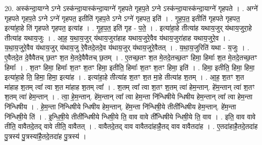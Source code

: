 \documentclass[17pt]{extarticle}
\begin{document}
20. अस्क॑न्दा॒याग्ने ऽग्ने ऽस्क॑न्दा॒यास्क॑न्दा॒याग्ने॑ गृहपते गृहप॒ते ऽग्ने ऽस्क॑न्दा॒यास्क॑न्दा॒याग्ने॑ गृहपते । . अग्ने॑ गृहपते गृहप॒ते ऽग्ने ऽग्ने॑ गृहपत॒ इतीति॑ गृहप॒ते ऽग्ने ऽग्ने॑ गृहपत॒ इति॑ । . गृ॒ह॒प॒त॒ इतीति॑ गृहपते गृहपत॒ इत्या॑हा॒हे ति॑ गृहपते गृहपत॒ इत्या॑ह । . गृ॒ह॒प॒त॒ इति॑ गृह - प॒ते॒ । . इत्या॑हा॒हे तीत्या॑ह यथाय॒जुर् य॑थाय॒जुरा॒हे तीत्या॑ह यथाय॒जुः । . आ॒ह॒ य॒था॒य॒जुर् य॑थाय॒जुरा॑हाह यथाय॒जुरे॒वैव य॑थाय॒जुरा॑हाह यथाय॒जुरे॒व । . य॒था॒य॒जुरे॒वैव य॑थाय॒जुर् य॑थाय॒जु रे॒वैतदे॒तदे॒व य॑थाय॒जुर् य॑थाय॒जुरे॒वैतत् । . य॒था॒य॒जुरिति॑ यथा - य॒जुः । . ए॒वैतदे॒त दे॒वैवैतच् छ॒तꣳ श॒त मे॒तदे॒वैवैतच् छ॒तम् । . ए॒तच्छ॒तꣳ श॒त मे॒तदे॒तच्छ॒तꣳ हिमा॒ हिमाः᳚ श॒त मे॒तदे॒तच्छ॒तꣳ हिमाः᳚ । . श॒तꣳ हिमा॒ हिमाः᳚ श॒तꣳ श॒तꣳ हिमा॒ इतीति॒ हिमाः᳚ श॒तꣳ श॒तꣳ हिमा॒ इति॑ । . हिमा॒ इतीति॒ हिमा॒ हिमा॒ इत्या॑हा॒हे ति॒ हिमा॒ हिमा॒ इत्या॑ह । . इत्या॑हा॒हे तीत्या॑ह श॒तꣳ श॒त मा॒हे तीत्या॑ह श॒तम् । . आ॒ह॒ श॒तꣳ श॒त मा॑हाह श॒तम् त्वा᳚ त्वा श॒त मा॑हाह श॒तम् त्वा᳚ । . श॒तम् त्वा᳚ त्वा श॒तꣳ श॒तम् त्वा॑ हेम॒न्तान्. हे॑म॒न्तान् त्वा॑ श॒तꣳ श॒तम् त्वा॑ हेम॒न्तान् । . त्वा॒ हे॒म॒न्तान्. हे॑म॒न्तान् त्वा᳚ त्वा हेम॒न्ता नि॑न्धिषीये न्धिषीय हेम॒न्तान् त्वा᳚ त्वा हेम॒न्ता नि॑न्धिषीय । . हे॒म॒न्ता नि॑न्धिषीये न्धिषीय हेम॒न्तान्. हे॑म॒न्ता नि॑न्धिषी॒ये तीती᳚न्धिषीय हेम॒न्तान्. हे॑म॒न्ता नि॑न्धिषी॒ये ति॑ । . इ॒न्धि॒षी॒ये तीती᳚न्धिषीये न्धिषी॒ये ति॒ वाव वावे ती᳚न्धिषीये न्धिषी॒ये ति॒ वाव । . इति॒ वाव वावे तीति॒ वावैतदे॒तद् वावे तीति॒ वावैतत् । . वावैतदे॒तद् वाव वावैतदा॑हाहै॒तद् वाव वावैतदा॑ह । . ए॒तदा॑हाहै॒तदे॒तदा॑ह पु॒त्रस्य॑ पु॒त्रस्या॑है॒तदे॒तदा॑ह पु॒त्रस्य॑ । \newline
\end{document}
